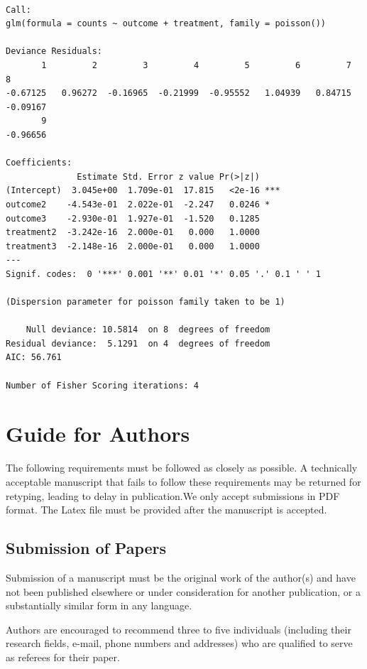 \documentclass[letterpaper,inpress]{jdsart}
\begin{document}
\begin{verbatim}

Call:
glm(formula = counts ~ outcome + treatment, family = poisson())

Deviance Residuals: 
       1         2         3         4         5         6         7         8  
-0.67125   0.96272  -0.16965  -0.21999  -0.95552   1.04939   0.84715  -0.09167  
       9  
-0.96656  

Coefficients:
              Estimate Std. Error z value Pr(>|z|)    
(Intercept)  3.045e+00  1.709e-01  17.815   <2e-16 ***
outcome2    -4.543e-01  2.022e-01  -2.247   0.0246 *  
outcome3    -2.930e-01  1.927e-01  -1.520   0.1285    
treatment2  -3.242e-16  2.000e-01   0.000   1.0000    
treatment3  -2.148e-16  2.000e-01   0.000   1.0000    
---
Signif. codes:  0 '***' 0.001 '**' 0.01 '*' 0.05 '.' 0.1 ' ' 1

(Dispersion parameter for poisson family taken to be 1)

    Null deviance: 10.5814  on 8  degrees of freedom
Residual deviance:  5.1291  on 4  degrees of freedom
AIC: 56.761

Number of Fisher Scoring iterations: 4
\end{verbatim}

\hypertarget{guide-for-authors}{%
\section{Guide for Authors}\label{guide-for-authors}}

The following requirements must be followed as closely as possible. A
technically acceptable manuscript that fails to follow these requirements may be
returned for retyping, leading to delay in publication.We only accept
submissions in PDF format. The Latex file must be provided after the manuscript
is accepted.

\hypertarget{submission-of-papers}{%
\subsection{Submission of Papers}\label{submission-of-papers}}

Submission of a manuscript must be the original work of the author(s) and have
not been published elsewhere or under consideration for another publication, or
a substantially similar form in any language.

Authors are encouraged to recommend three to five individuals (including their
research fields, e-mail, phone numbers and addresses) who are qualified to serve
as referees for their paper.
\end{document}
